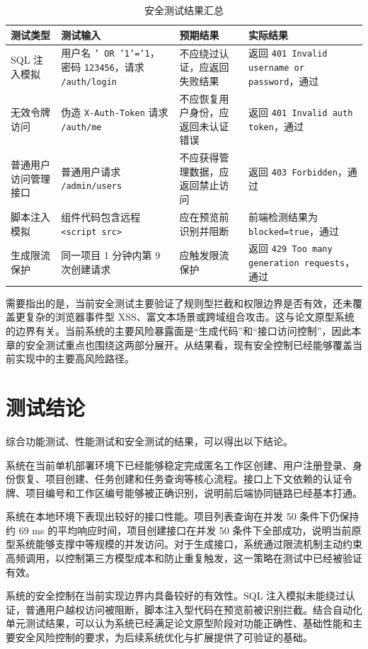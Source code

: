 \begin{table}[!htbp]
\centering
\caption{安全测试结果汇总}
\label{tab:chapter6-security}
\small
\begin{tabular}{@{}p{}p{}p{}p{}@{}}
\toprule
测试类型 & 测试输入 & 预期结果 & 实际结果 \\
\midrule
SQL 注入模拟 & 用户名 \texttt{' OR '1'='1}，密码 \texttt{123456}，请求 \texttt{/auth/login} & 不应绕过认证，应返回失败结果 & 返回 \texttt{401 Invalid username or password}，通过 \\
无效令牌访问 & 伪造 \texttt{X-Auth-Token} 请求 \texttt{/auth/me} & 不应恢复用户身份，应返回未认证错误 & 返回 \texttt{401 Invalid auth token}，通过 \\
普通用户访问管理接口 & 普通用户请求 \texttt{/admin/users} & 不应获得管理数据，应返回禁止访问 & 返回 \texttt{403 Forbidden}，通过 \\
脚本注入模拟 & 组件代码包含远程 \texttt{<script src>} & 应在预览前识别并阻断 & 前端检测结果为 \texttt{blocked=true}，通过 \\
生成限流保护 & 同一项目 1 分钟内第 9 次创建请求 & 应触发限流保护 & 返回 \texttt{429 Too many generation requests}，通过 \\
\bottomrule
\end{tabular}
\end{table}

需要指出的是，当前安全测试主要验证了规则型拦截和权限边界是否有效，还未覆盖更复杂的浏览器事件型 XSS、富文本场景或跨域组合攻击。这与论文原型系统的边界有关。当前系统的主要风险暴露面是“生成代码”和“接口访问控制”，因此本章的安全测试重点也围绕这两部分展开。从结果看，现有安全控制已经能够覆盖当前实现中的主要高风险路径。

\section{测试结论}
综合功能测试、性能测试和安全测试的结果，可以得出以下结论。

系统在当前单机部署环境下已经能够稳定完成匿名工作区创建、用户注册登录、身份恢复、项目创建、任务创建和任务查询等核心流程。接口上下文依赖的认证令牌、项目编号和工作区编号能够被正确识别，说明前后端协同链路已经基本打通。

系统在本地环境下表现出较好的接口性能。项目列表查询在并发 50 条件下仍保持约 69 ms 的平均响应时间，项目创建接口在并发 50 条件下全部成功，说明当前原型系统能够支撑中等规模的并发访问。对于生成接口，系统通过限流机制主动约束高频调用，以控制第三方模型成本和防止重复触发，这一策略在测试中已经被验证有效。

系统的安全控制在当前实现边界内具备较好的有效性。SQL 注入模拟未能绕过认证，普通用户越权访问被阻断，脚本注入型代码在预览前被识别拦截。结合自动化单元测试结果，可以认为系统已经满足论文原型阶段对功能正确性、基础性能和主要安全风险控制的要求，为后续系统优化与扩展提供了可验证的基础。
